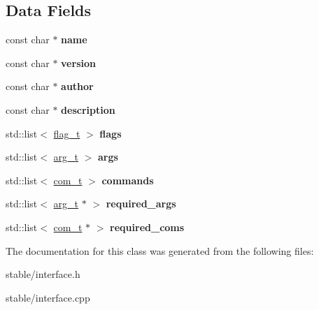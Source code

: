 \subsection*{Data Fields}
\begin{DoxyCompactItemize}
\item 
\hypertarget{classenv__t_a8a4fdbcdf5773e33d4a1553bc621e1b4}{const char $\ast$ {\bfseries name}}\label{classenv__t_a8a4fdbcdf5773e33d4a1553bc621e1b4}

\item 
\hypertarget{classenv__t_a837e459f0e0d418a976ed4e8fa6acd39}{const char $\ast$ {\bfseries version}}\label{classenv__t_a837e459f0e0d418a976ed4e8fa6acd39}

\item 
\hypertarget{classenv__t_a93b99498ee34c3e607bf2757b13443dc}{const char $\ast$ {\bfseries author}}\label{classenv__t_a93b99498ee34c3e607bf2757b13443dc}

\item 
\hypertarget{classenv__t_ae3578fa78fcac7714be35958427095c2}{const char $\ast$ {\bfseries description}}\label{classenv__t_ae3578fa78fcac7714be35958427095c2}

\item 
\hypertarget{classenv__t_a0b17ee1539e7a27fe0e5efb1ddf13af0}{std\-::list$<$ \hyperlink{classflag__t}{flag\-\_\-t} $>$ {\bfseries flags}}\label{classenv__t_a0b17ee1539e7a27fe0e5efb1ddf13af0}

\item 
\hypertarget{classenv__t_ae74e249d826b986f6af2f5450cd246df}{std\-::list$<$ \hyperlink{classarg__t}{arg\-\_\-t} $>$ {\bfseries args}}\label{classenv__t_ae74e249d826b986f6af2f5450cd246df}

\item 
\hypertarget{classenv__t_a26bd9c2ce445926975e57dbe831f4a39}{std\-::list$<$ \hyperlink{classcom__t}{com\-\_\-t} $>$ {\bfseries commands}}\label{classenv__t_a26bd9c2ce445926975e57dbe831f4a39}

\item 
\hypertarget{classenv__t_aa756e347b263bb995d2e1b469cccf4cd}{std\-::list$<$ \hyperlink{classarg__t}{arg\-\_\-t} $\ast$ $>$ {\bfseries required\-\_\-args}}\label{classenv__t_aa756e347b263bb995d2e1b469cccf4cd}

\item 
\hypertarget{classenv__t_a933addf499dd49e5ee6883c4960e1a44}{std\-::list$<$ \hyperlink{classcom__t}{com\-\_\-t} $\ast$ $>$ {\bfseries required\-\_\-coms}}\label{classenv__t_a933addf499dd49e5ee6883c4960e1a44}

\end{DoxyCompactItemize}


The documentation for this class was generated from the following files\-:\begin{DoxyCompactItemize}
\item 
stable/interface.\-h\item 
stable/interface.\-cpp\end{DoxyCompactItemize}

